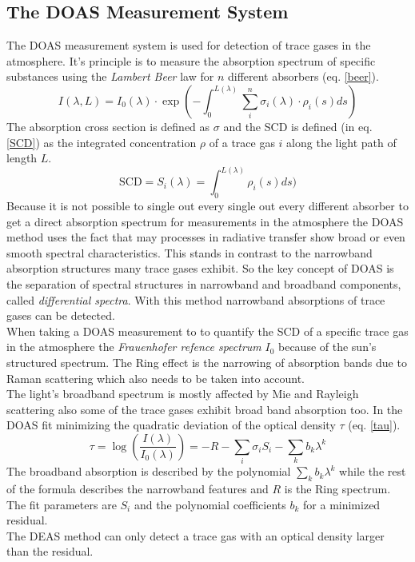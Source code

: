 \documentclass[12pt, english]{scrartcl} %
\begin{document}
\begin{multicols}{2}
 \subsection{The DOAS Measurement System}
The DOAS measurement system is used for detection of trace gases in the atmosphere. It's principle is to measure the absorption spectrum of specific substances using the \textit{Lambert Beer} law for $n$ different absorbers (eq. \ref{beer}).
\begin{equation}\label{beer}
I(\lambda, L) = I_0(\lambda) \cdot \exp (- \int^{L(\lambda)}_0 \sum_i^n \sigma_i(\lambda) \cdot \rho_i(s) ds)
\end{equation}
The absorption cross section is defined as $\sigma$ and the SCD is defined (in eq. \ref{SCD}) as the integrated concentration $\rho$ of a trace gas $i$ along the light path of length $L$.
\begin{equation}\label{SCD}
\text{SCD} = S_i(\lambda) =\int^{L(\lambda)}_0  \rho_i(s) ds)
\end{equation}
Because it is not possible to single out every single out every different absorber to get a direct absorption spectrum for measurements in the atmosphere the DOAS method uses the fact that may processes in radiative transfer show broad or even smooth spectral characteristics. This stands in contrast to the narrowband absorption structures many trace gases exhibit. So the key concept of DOAS is the separation of spectral structures in narrowband and broadband components, called \textit{differential spectra}. With this method narrowband absorptions of trace gases can be detected.\\
When taking a DOAS measurement to to quantify the SCD of a specific trace gas in the atmosphere the \textit{Frauenhofer refence spectrum} $I_0$ because of the sun's structured spectrum. The Ring effect is the narrowing of absorption bands due to Raman scattering which also needs to be taken into account.\\
The light's broadband spectrum is mostly affected by Mie and Rayleigh scattering also some of the trace gases exhibit broad band absorption too. In the DOAS fit minimizing the quadratic deviation of the optical density $\tau$ (eq. \ref{tau}).
\begin{equation}\label{tau}
\tau = \log (\frac{I(\lambda)}{I_0(\lambda) }) = -R -\sum_i \sigma_i S_i - \sum_k b_k \lambda^k
\end{equation}
The broadband absorption is described by the polynomial $\sum_k b_k \lambda^k$ while the rest of the formula describes the narrowband features and $R$ is the Ring spectrum. The fit parameters are $S_i$ and the polynomial coefficients $b_k$ for a minimized residual.\\
The DEAS method can only detect a trace gas with an optical density larger than the residual.
\newpage

\end{multicols}
\end{document}
